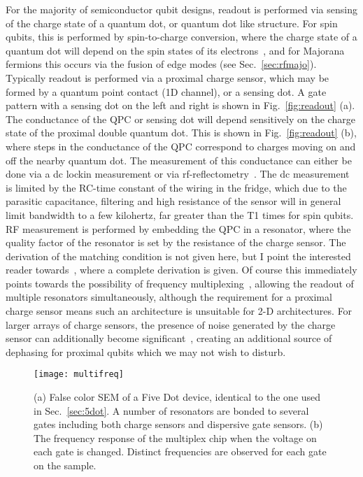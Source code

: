 For the majority of semiconductor qubit designs, readout is performed via sensing of the charge state of a quantum dot, or quantum dot like
structure. For spin qubits, this is performed by spin-to-charge conversion, where the charge state of a quantum dot will depend on the spin states
of its electrons~\cite{nature02693,PhysRevB.98.125404}, and for Majorana fermions this occurs via the fusion of edge modes (see Sec.~\ref{sec:rfmajo}).
Typically readout is performed via a proximal charge sensor, which may be formed by a quantum point contact (1D channel), or a sensing dot. A gate pattern
with a sensing dot on the left and right is shown in Fig.~\ref{fig:readout} (a). The conductance of the QPC or sensing dot will depend sensitively
on the charge state of the proximal double quantum dot. This is shown in Fig.~\ref{fig:readout} (b), where steps in the conductance of the QPC correspond to
charges moving on and off the nearby quantum dot. The measurement of this conductance can either be done via a dc lockin measurement or via
rf-reflectometry~\cite{Reilly:2007ig}. The dc measurement is limited by the RC-time constant of the wiring in the fridge, which due to the parasitic
capacitance, filtering and high resistance of the sensor will in general limit bandwidth to a few kilohertz, far greater than the T1 times for spin qubits.
RF measurement is performed by embedding the QPC in a resonator, where the quality factor of the resonator is set by the resistance of the charge sensor.
The derivation of the matching condition is not given here, but I point the interested reader towards~\cite{crootthesis}, where a complete derivation is given.
Of course this immediately points towards the possibility of frequency multiplexing~\cite{doi:10.1063/1.4868107}, allowing the readout of multiple
resonators simultaneously, although the requirement for a proximal charge sensor means such an architecture is unsuitable for 2-D architectures. For larger
arrays of charge sensors, the presence of noise generated by the charge sensor can additionally become significant~\cite{PhysRevB.78.035324}, creating
an additional source of dephasing for proximal qubits which we may not wish to disturb.

\begin{figure}
  \texttt{[image: multifreq]}
  \caption[Frequency multiplexed readout of a five-dot device]
  {\label{fig:multifreq}(a) False color SEM of a Five Dot device, identical to the one used in Sec.~\ref{sec:5dot}. A number of resonators are bonded to several gates
  including both charge sensors and dispersive gate sensors. (b) The frequency response of the multiplex chip when the voltage on each gate is changed. Distinct frequencies
  are observed for each gate on the sample.}
\end{figure}

